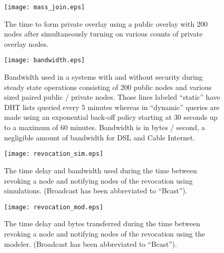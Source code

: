 \begin{figure}[ht]
\centering
\texttt{[image: mass\_join.eps]}
\caption[Large simultaneous private pool joins.]{The time to form private
overlay using a public overlay with 200 nodes after simultaneously turning on
various counts of private overlay nodes.}
\label{fig:big_join}
\end{figure}

\begin{figure}[ht]
\centering
\texttt{[image: bandwidth.eps]}
\caption[Bandwidth comparison of insecure and secure overlays.]{Bandwidth used
in a systems with and without security during steady state operations
consisting of 200 public nodes and various sized paired public / private nodes.
Those lines labeled ``static'' have DHT lists queried every 5 minutes whereas
in ``dynamic'' queries are made using an exponential back-off policy starting
at 30 seconds up to a maximum of 60 minutes.  Bandwidth is in bytes / second, a
negligible amount of bandwidth for DSL and Cable Internet.}
\label{fig:vpo_bandwidth}
\end{figure}

\begin{figure}[ht]
\centering
\texttt{[image: revocation\_sim.eps]}
\caption[Simulated broadcast revocation evaluation.]{The time delay and
bandwidth used during the time between revoking a node and notifying nodes of
the revocation using simulations.  (Broadcast has been abbreviated to
``Bcast'').}
\label{fig:revocation_sim}
\end{figure}

\begin{figure}[ht]
\centering
\texttt{[image: revocation\_mod.eps]}
\caption[Modeled broadcast revocation evaluation.]{The time delay and bytes
transferred during the time between revoking a node and notifying nodes of the
revocation using the modeler.  (Broadcast has been abbreviated to ``Bcast'').}
\label{fig:revocation_mod}
\end{figure}

